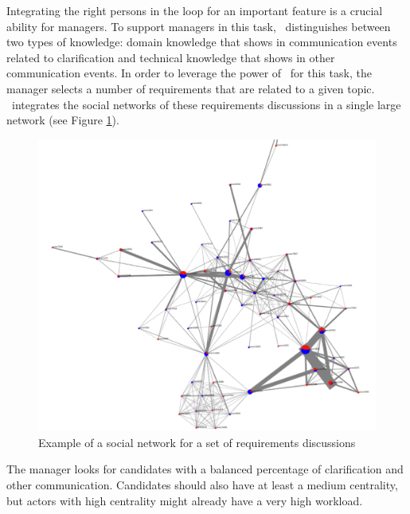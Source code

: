 Integrating the right persons in the loop for an important feature is a crucial ability for managers.
To support managers in this task, \viss\ distinguishes between two types of knowledge: domain knowledge that shows in communication events related to clarification and technical knowledge that shows in other communication events.
In order to leverage the power of \viss\ for this task, the manager selects a number of requirements that are related to a given topic. 
\viss\ integrates the social networks of these requirements discussions in a single large network (see Figure \ref{fig:example-sn-large}).
\begin{figure}
\includegraphics[width=\columnwidth]{img/example-sn-large}
\caption{Example of a social network for a set of requirements discussions}
\label{fig:example-sn-large}
\end{figure}
The manager looks for candidates with a balanced percentage of clarification and other communication.
Candidates should also have at least a medium centrality, but actors with high centrality might already have a very high workload.
